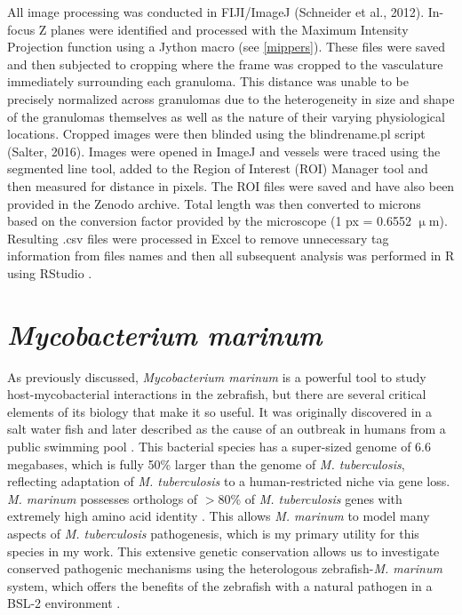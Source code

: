 All image processing was conducted in FIJI/ImageJ (Schneider et al., 2012). In\hyp{}focus Z planes were identified and processed with the Maximum Intensity Projection function using a Jython macro (see \autoref{mippers}). These files were saved and then subjected to cropping where the frame was cropped to the vasculature immediately surrounding each granuloma. This distance was unable to be precisely normalized across granulomas due to the heterogeneity in size and shape of the granulomas themselves as well as the nature of their varying physiological locations. Cropped images were then blinded using the blindrename.pl script (Salter, 2016). Images were opened in ImageJ and vessels were traced using the segmented line tool, added to the Region of Interest (ROI) Manager tool and then measured for distance in pixels. The ROI files were saved and have also been provided in the Zenodo archive. Total length was then converted to microns based on the conversion factor provided by the microscope (1 px = 0.6552 $\upmu$m). Resulting .csv files were processed in Excel to remove unnecessary tag information from files names and then all subsequent analysis was performed in R using RStudio \citep{RCoreTeam2022, RStudioTeam2022}.

\section{\textit{Mycobacterium marinum}}\label{marinum}

As previously discussed, \textit{Mycobacterium marinum} is a powerful tool to study host\hyp{}mycobacterial interactions in the zebrafish, but there are several critical elements of its biology that make it so useful. It was originally discovered in a salt water fish and later described as the cause of an outbreak in humans from a public swimming pool \citep{Aronson1926, Linell1954}. This bacterial species has a super\hyp{}sized genome of 6.6 megabases, which is fully 50\% larger than the genome of \textit{M. tuberculosis}, reflecting adaptation of \textit{M. tuberculosis} to a human\hyp{}restricted niche via gene loss. \textit{M. marinum} possesses orthologs of $>$80\% of \textit{M. tuberculosis} genes with extremely high amino acid identity \citep{Stinear2008}. This allows \textit{M. marinum} to model many aspects of \textit{M. tuberculosis} pathogenesis, which is my primary utility for this species in my work. This extensive genetic conservation allows us to investigate conserved pathogenic mechanisms using the heterologous zebrafish\hyp{}\textit{M. marinum} system, which offers the benefits of the zebrafish with a natural pathogen in a BSL\hyp{}2 environment \citep{Tobin2008}. 

